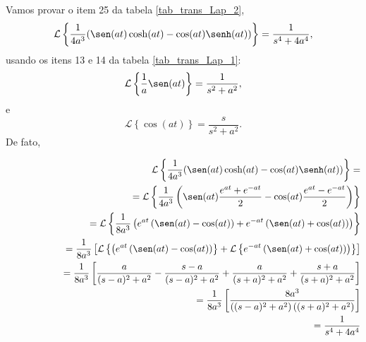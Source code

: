 \begin{ex}Vamos provar o item 25 da tabela \ref{tab_trans_Lap_2},
\begin{equation}
\mathcal{L}\left\{ \frac{1}{4a^3}(\sen(at)\cosh(at)-\cos(at)\senh(at))\right\}=\frac{1}{s^4+4a^4},
\end{equation}
usando os itens 13 e 14 da tabela \ref{tab_trans_Lap_1}:
\begin{equation}
\mathcal{L}\left\{\frac{1}{a}\sen(at)\right\}=\frac{1}{s^2+a^2},
\end{equation}
e
\begin{equation}
\mathcal{L}\left\{\cos(at)\right\}=\frac{s}{s^2+a^2}.
\end{equation}
De fato,
\begin{small}
\begin{eqnarray*}
&&\mathcal{L}\left\{ \frac{1}{4a^3}(\sen(at)\cosh(at)-\cos(at)\senh(at))\right\}=\\
&&\qquad\qquad\quad=\mathcal{L}\left\{ \frac{1}{4a^3}\left(\sen(at)\frac{e^{at}+e^{-at}}{2}-\cos(at)\frac{e^{at}-e^{-at}}{2}\right)\right\}\\
&&\qquad\qquad\quad=\mathcal{L}\left\{ \frac{1}{8a^3}\left(e^{at}\left( \sen(at)-\cos(at)\right)+e^{-at}\left(\sen(at)+\cos(at)\right)\right)\right\}\\
&&\qquad\qquad\quad=\frac{1}{8a^3}\left[ \mathcal{L}\left\{ \left(e^{at}\left( \sen(at)-\cos(at)\right)\right\}+\mathcal{L}\left\{e^{-at}\left(\sen(at)+\cos(at)\right)\right)\right\}\right]\\
&&\qquad\qquad\quad=\frac{1}{8a^3}\left[\frac{a}{(s-a)^2+a^2}-\frac{s-a}{(s-a)^2+a^2}+\frac{a}{(s+a)^2+a^2}+\frac{s+a}{(s+a)^2+a^2}\right]\\
&&\qquad\qquad\quad=\frac{1}{8a^3}\left[\frac{8a^3}{\left((s-a)^2+a^2\right)\left((s+a)^2+a^2\right)}\right]\\
&&\qquad\qquad\quad=\frac{1}{s^4+4a^4}
\end{eqnarray*}
\end{small}
\end{ex}

